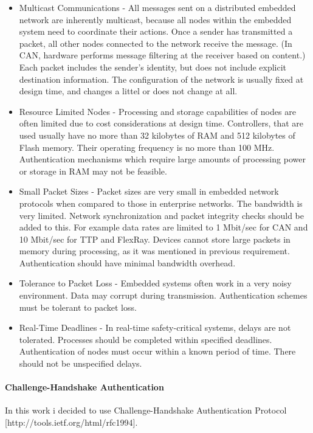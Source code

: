 \begin{itemize}
  \item{Multicast Communications} - All messages sent on a
distributed embedded network are inherently multicast,
because all nodes within the embedded system need to
coordinate their actions. Once a sender has transmitted a
packet, all other nodes connected to the network receive the
message. (In CAN, hardware performs message filtering at the
receiver based on content.) Each packet includes the sender's
identity, but does not include explicit destination information. The configuration of the network is
usually fixed at design time, and changes a littel or  does not change at all.
\item{Resource Limited Nodes} - 
Processing and storage capabilities
of nodes are often limited due to cost considerations at design
time. Controllers, that are used usually have no more than 32 kilobytes of RAM
and 512 kilobytes of Flash memory. Their operating frequency is no more than 100
MHz. Authentication mechanisms which require large amounts of
processing power or storage in RAM may not be feasible.
\item{Small Packet Sizes} - Packet sizes are very small in embedded
network protocols when compared to those in enterprise
networks. The bandwidth is very limited. Network synchronization and packet
integrity checks should be added to this. For example data rates are limited to
1 Mbit/sec for CAN and 10 Mbit/sec for TTP and FlexRay. Devices cannot store
large packets in memory during processing, as it was mentioned in previous
requirement. Authentication should have minimal bandwidth overhead.
\item{Tolerance to Packet Loss} - Embedded systems often work in a
very noisy environment. Data may corrupt during transmission. Authentication
schemes must be tolerant to packet loss.
\item{Real-Time Deadlines} - In real-time safety-critical systems, delays are
not tolerated. Processes should be completed within specified deadlines.
Authentication of nodes must occur within a known period of time. There should
not be unspecified delays.
\end{itemize}


\paragraph{Challenge-Handshake Authentication}

In this work i decided to use Challenge-Handshake Authentication Protocol
[http://tools.ietf.org/html/rfc1994].

